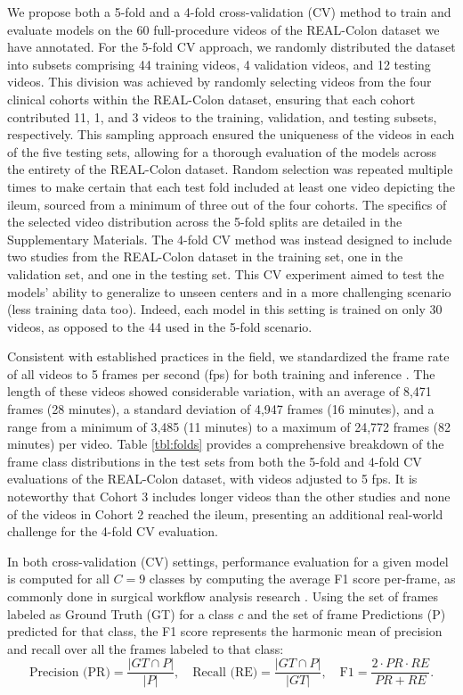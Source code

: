 We propose both a 5-fold and a 4-fold cross-validation (CV) method to train and evaluate models on the 60 full-procedure videos of the REAL-Colon dataset we have annotated. For the 5-fold CV approach, we randomly distributed the dataset into subsets comprising 44 training videos, 4 validation videos, and 12 testing videos. This division was achieved by randomly selecting videos from the four clinical cohorts within the REAL-Colon dataset, ensuring that each cohort contributed 11, 1, and 3 videos to the training, validation, and testing subsets, respectively. This sampling approach ensured the uniqueness of the videos in each of the five testing sets, allowing for a thorough evaluation of the models across the entirety of the REAL-Colon dataset. Random selection was repeated multiple times to make certain that each test fold included at least one video depicting the ileum, sourced from a minimum of three out of the four cohorts. The specifics of the selected video distribution across the 5-fold splits are detailed in the Supplementary Materials. The 4-fold CV method was instead designed to include two studies from the REAL-Colon dataset in the training set, one in the validation set, and one in the testing set. This CV experiment aimed to test the models' ability to generalize to unseen centers and in a more challenging scenario (less training data too). Indeed, each model in this setting is trained on only 30 videos, as opposed to the 44 used in the 5-fold scenario.



Consistent with established practices in the field, we standardized the frame rate of all videos to 5 frames per second (fps) for both training and inference \cite{czempiel2020tecno,demir2023deep}. The length of these videos showed considerable variation, with an average of 8,471 frames (28 minutes), a standard deviation of 4,947 frames (16 minutes), and a range from a minimum of 3,485 (11 minutes) to a maximum of 24,772 frames (82 minutes) per video. Table \ref{tbl:folds} provides a comprehensive breakdown of the frame class distributions in the test sets from both the 5-fold and 4-fold CV evaluations of the REAL-Colon dataset, with videos adjusted to 5 fps. It is noteworthy that Cohort 3 includes longer videos than the other studies and none of the videos in Cohort 2 reached the ileum, presenting an additional real-world challenge for the 4-fold CV evaluation.

In both cross-validation (CV) settings, performance evaluation for a given model is computed for all $C=9$ classes by computing the average F1 score per-frame, as commonly done in surgical workflow analysis research \cite{demir2023deep}. Using the set of frames labeled as Ground Truth (GT) for a class \(c\) and the set of frame Predictions (P) predicted for that class, the F1 score represents the harmonic mean of precision and recall over all the frames labeled to that class:
\[
\text{Precision (PR)} = \frac{|GT \cap P|}{|P|}, \quad \text{Recall (RE)} = \frac{|GT \cap P|}{|GT|}, \quad \text{F1} = \frac{2 \cdot PR \cdot RE}{PR + RE}.
\]


